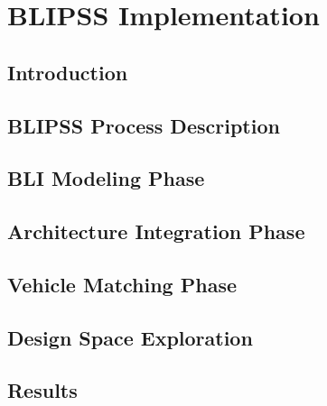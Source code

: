 \chapter{BLIPSS Implementation}

\section{Introduction}

\section{BLIPSS Process Description}

\section{BLI Modeling Phase}

\section{Architecture Integration Phase}

\section{Vehicle Matching Phase}

\section{Design Space Exploration}

\section{Results}


